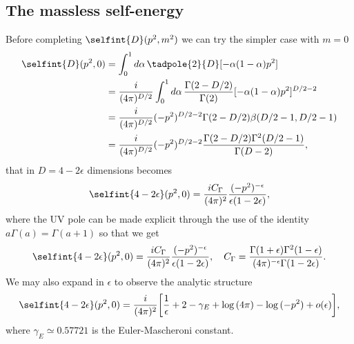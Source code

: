 \subsection{The massless self-energy}
Before completing $\selfint{D}(p^2,m^2)$ we can try the simpler case with $m = 0$ 
\begin{equation}
    \begin{split}
        \selfint{D}(p^2,0) &= \int_0^1 d\alpha\,\tadpole{2}{D}[-\alpha(1-\alpha)p^2] \\
        &= \frac{i}{(4\pi)^{D/2}}\int_0^1 d\alpha\,\frac{\Gamma(2 - D/2)}{\Gamma(2)}[-\alpha(1-\alpha)p^2]^{D/2 - 2} \\
        &= \frac{i}{(4\pi)^{D/2}}(-p^2)^{D/2 - 2}\Gamma(2 - D/2)\beta(D/2 - 1,D/2 - 1) \\
        &= \frac{i}{(4\pi)^{D/2}}(-p^2)^{D/2 - 2}\frac{\Gamma(2 - D/2)\Gamma^2(D/2 - 1)}{\Gamma(D - 2)},
    \end{split}
\end{equation}
that in $D = 4 - 2\epsilon$ dimensions becomes
\begin{equation}
    \selfint{4 - 2\epsilon}(p^2,0) = \frac{iC_\Gamma}{(4\pi)^2}\frac{(-p^2)^{-\epsilon}}{\epsilon(1 - 2\epsilon)},
\end{equation}
where the UV pole can be made explicit through the use of the identity $a\Gamma(a) = \Gamma(a + 1)$ so that we get
\begin{equation}
    \selfint{4 - 2\epsilon}(p^2,0) = \frac{iC_\Gamma}{(4\pi)^2}\frac{(-p^2)^{-\epsilon}}{\epsilon(1 - 2\epsilon)},\quad C_\Gamma = \frac{\Gamma(1+\epsilon)\Gamma^2(1-\epsilon)}{(4\pi)^{-\epsilon}\Gamma(1-2\epsilon)}.
\end{equation}
We may also expand in $\epsilon$ to observe the analytic structure
\begin{equation}
\label{eq: massless self-energy integral}
    \selfint{4 - 2\epsilon}(p^2,0) = \frac{i}{(4\pi)^2}\bigg[\frac{1}{\epsilon} + 2 - \gamma_E + \log{(4\pi)} - \log{(-p^2)} + o(\epsilon)\bigg],
\end{equation}
where $\gamma_E \simeq 0.57721$ is the Euler-Mascheroni constant. 

